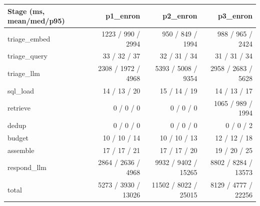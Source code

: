 \begin{tabular}{lrrr}
\toprule
Stage (ms, mean/med/p95) & p1\_enron & p2\_enron & p3\_enron \\
\midrule
triage\_embed & 1223 / 990 / 2994 & 950 / 849 / 1994 & 988 / 965 / 2424 \\
triage\_query & 33 / 32 / 37 & 32 / 31 / 34 & 31 / 31 / 34 \\
triage\_llm & 2308 / 1972 / 4968 & 5393 / 5008 / 9354 & 2958 / 2683 / 5628 \\
sql\_load & 14 / 13 / 20 & 15 / 14 / 19 & 14 / 13 / 17 \\
retrieve & 0 / 0 / 0 & 0 / 0 / 0 & 1065 / 989 / 1994 \\
dedup & 0 / 0 / 0 & 0 / 0 / 0 & 0 / 0 / 2 \\
budget & 10 / 10 / 14 & 10 / 10 / 13 & 12 / 12 / 18 \\
assemble & 17 / 17 / 21 & 17 / 17 / 20 & 19 / 20 / 25 \\
respond\_llm & 2864 / 2636 / 4968 & 9932 / 9402 / 15265 & 8802 / 8284 / 13573 \\
total & 5273 / 3930 / 13026 & 11502 / 8022 / 25015 & 8129 / 4777 / 22256 \\
\bottomrule
\end{tabular}
